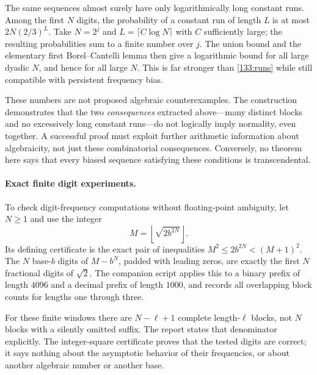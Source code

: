 \documentclass[11pt,a4paper]{article}
\numberwithin{equation}{section}
\begin{document}
The same sequences almost surely have only logarithmically long
constant runs.  Among the first $N$ digits, the probability of a
constant run of length $L$ is at most
$2N(2/3)^L$.  Take $N=2^j$ and $L=\lceil C\log N\rceil$ with
$C$ sufficiently large; the resulting probabilities sum to a finite
number over $j$.  The union bound and the elementary first
Borel--Cantelli lemma then give a logarithmic bound for all large
dyadic $N$, and hence for all large $N$.  This is far stronger than
\eqref{133:runs} while still compatible with persistent frequency bias.

These numbers are not proposed algebraic counterexamples.  The
construction demonstrates that the two \emph{consequences} extracted
above---many distinct blocks and no excessively long constant
runs---do not logically imply normality, even together.  A successful
proof must exploit further arithmetic information about algebraicity,
not just these combinatorial consequences.  Conversely, no theorem
here says that every biased sequence satisfying these conditions is
transcendental.

\paragraph{Exact finite digit experiments.}
To check digit-frequency computations without floating-point ambiguity,
let $N\geq1$ and use the integer
\[
 M=\left\lfloor\sqrt{2b^{2N}}\right\rfloor.
\]
Its defining certificate is the exact pair of inequalities
$M^2\leq2b^{2N}<(M+1)^2$.  The $N$ base-$b$ digits of $M-b^N$,
padded with leading zeros, are exactly the first $N$ fractional digits
of $\sqrt2$.  The companion script applies this to a binary prefix
of length $4096$ and a decimal prefix of length $1000$, and records
all overlapping block counts for lengths one through three.

For these finite windows there are $N-\ell+1$ complete length-$\ell$
blocks, not $N$ blocks with a silently omitted suffix.  The report
states that denominator explicitly.  The integer-square certificate
proves that the tested digits are correct; it says nothing about the
asymptotic behavior of their frequencies, or about another algebraic
number or another base.
\end{document}
